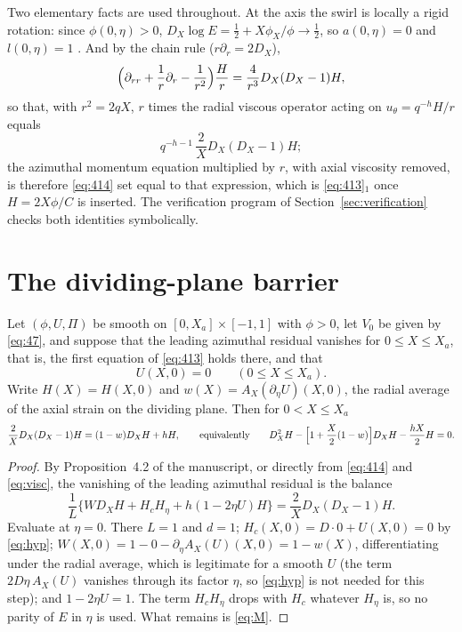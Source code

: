 \documentclass[11pt]{article}
\newcommand{\DX}{D_X}
\newcommand{\Hc}{H_c}
\newcommand{\AX}{A_X}
\begin{document}
Two elementary facts are used throughout. At the axis the swirl is locally a rigid rotation: since $\phi(0,\eta)>0$, $\DX\log E=\tfrac12+X\phi_X/\phi\to\tfrac12$, so $a(0,\eta)=0$ and $l(0,\eta)=1$ \cite[p.~26]{OpenAINS}. And by the chain rule ($r\partial_r=2\DX$),
\begin{equation}\label{eq:visc}
\Bigl(\partial_{rr}+\frac1r\partial_r-\frac1{r^2}\Bigr)\frac{H}{r}=\frac{4}{r^3}\DX(\DX-1)H,
\end{equation}
so that, with $r^2=2qX$, $r$ times the radial viscous operator acting on $u_\theta=q^{-h}H/r$ equals
\[
q^{-h-1}\,\frac2X\DX(\DX-1)H ;
\]
the azimuthal momentum equation multiplied by $r$, with axial viscosity removed, is therefore \eqref{eq:414} set equal to that expression, which is \eqref{eq:413}$_1$ once $H=2X\phi/C$ is inserted. The verification program of Section~\ref{sec:verification} checks both identities symbolically.

\section{The dividing-plane barrier}\label{sec:barrier}

\begin{lemma}\label{lem:M}
Let $(\phi,U,\Pi)$ be smooth on $[0,X_a]\times[-1,1]$ with $\phi>0$, let $V_0$ be given by \eqref{eq:47}, and suppose that the leading azimuthal residual vanishes for $0\le X\le X_a$, that is, the first equation of \eqref{eq:413} holds there, and that
\begin{equation}\label{eq:hyp}
U(X,0)=0\qquad(0\le X\le X_a).
\end{equation}
Write $H(X)=H(X,0)$ and $w(X)=\AX(\partial_\eta U)(X,0)$, the radial average of the axial strain on the dividing plane. Then for $0<X\le X_a$
\begin{equation}\label{eq:M}
\frac2X\DX(\DX-1)H=(1-w)\DX H+hH,\qquad\text{equivalently}\qquad \DX^2H-\Bigl[1+\frac X2(1-w)\Bigr]\DX H-\frac{hX}{2}H=0.
\end{equation}
\end{lemma}

\begin{proof}
By Proposition~4.2 of the manuscript, or directly from \eqref{eq:414} and \eqref{eq:visc}, the vanishing of the leading azimuthal residual is the balance
\[
\frac1L\bigl\{W\DX H+\Hc H_\eta+h(1-2\eta U)H\bigr\}=\frac2X\DX(\DX-1)H .
\]
Evaluate at $\eta=0$. There $L=1$ and $d=1$; $\Hc(X,0)=D\cdot0+U(X,0)=0$ by \eqref{eq:hyp}; $W(X,0)=1-0-\partial_\eta\AX(U)(X,0)=1-w(X)$, differentiating under the radial average, which is legitimate for a smooth $U$ (the term $2D\eta\,\AX(U)$ vanishes through its factor $\eta$, so \eqref{eq:hyp} is not needed for this step); and $1-2\eta U=1$. The term $\Hc H_\eta$ drops with $\Hc$ whatever $H_\eta$ is, so no parity of $E$ in $\eta$ is used. What remains is \eqref{eq:M}.
\end{proof}
\end{document}
